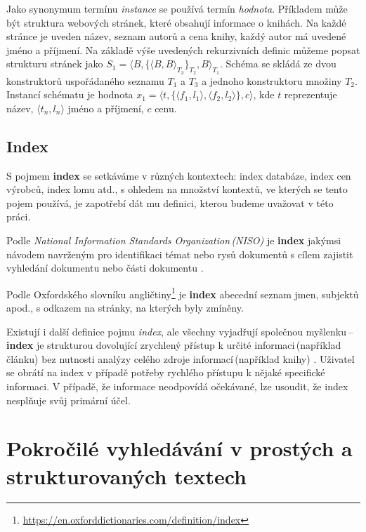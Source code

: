 Jako synonymum termínu \emph{instance} se používá termín \emph{hodnota}. Příkladem může být struktura webových stránek, které obsahují informace o knihách. Na každé stránce je uveden název, seznam autorů a cena knihy,  každý autor má uvedené jméno a příjmení. Na základě výše uvedených rekurzivních definic můžeme popsat strukturu stránek jako $S_1 = \langle B, \{\langle B, B \rangle_{T_3}\}_{T_2}, B\rangle_{T_1}$. Schéma se skládá ze dvou konstruktorů uspořádaného seznamu $T_1$ a $T_3$ a jednoho konstruktoru množiny $T_2$. Instancí schématu je hodnota $x_1 = \langle t, \{\langle f_1, l_1 \rangle, \langle f_2, l_2 \rangle \}, c\rangle$, kde $t$ reprezentuje název, $\langle t_n, l_n \rangle$ jméno a příjmení, $c$ cenu.


\subsection*{Index}
S pojmem \textbf{index} se setkáváme v různých kontextech: index databáze, index cen výrobců, index lomu atd., s ohledem na množství kontextů, ve kterých se tento pojem používá, je zapotřebí dát mu definici, kterou budeme uvažovat v této práci.

Podle \emph{National Information Standards Organization\,(NISO)}  je \textbf{index}  jakýmsi návodem navrženým pro identifikaci témat nebo  rysů dokumentů s cílem zajistit vyhledání dokumentu nebo části dokumentu \cite{GuidlinesForIndexesAndRelated}. 

Podle Oxfordského slovníku angličtiny\footnote{\href{https://en.oxforddictionaries.com/definition/index}{https://en.oxforddictionaries.com/definition/index}} je \textbf{index} abecední seznam jmen, subjektů apod., s odkazem na stránky, na kterých byly zmíněny.

Existují i další definice pojmu \emph{index}, ale všechny  vyjadřují společnou myšlenku\,--\,\textbf{index} je strukturou dovolující zrychlený přístup k určité informaci\,(například článku) bez nutnosti analýzy celého zdroje informací\,(například knihy) \cite{IndexingBooks}. Uživatel se obrátí na index v případě potřeby rychlého přístupu k nějaké specifické informaci. V případě, že informace neodpovídá očekávané, lze usoudit, že index nesplňuje svůj primární účel.



\section{Pokročilé vyhledávání v prostých a strukturovaných textech}

